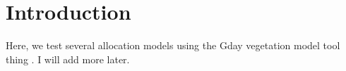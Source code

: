 \chapter{Introduction}

Here, we test several allocation models using the Gday vegetation model tool thing \citep{Comins1993,Corbeels2005}. I will add more later.